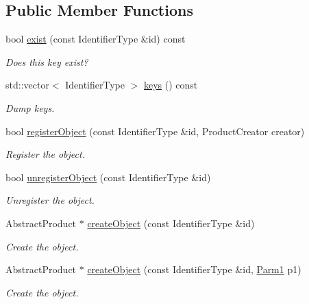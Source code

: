 \subsection*{Public Member Functions}
\begin{DoxyCompactItemize}
\item 
bool \mbox{\hyperlink{classUtil_1_1ObjectFactory_acb89fb305fe8ed1a52fa92d1f463d449}{exist}} (const Identifier\+Type \&id) const
\begin{DoxyCompactList}\small\item\em Does this key exist? \end{DoxyCompactList}\item 
std\+::vector$<$ Identifier\+Type $>$ \mbox{\hyperlink{classUtil_1_1ObjectFactory_a10d2a7a76f67d69f545b7fc69fdc71e0}{keys}} () const
\begin{DoxyCompactList}\small\item\em Dump keys. \end{DoxyCompactList}\item 
bool \mbox{\hyperlink{classUtil_1_1ObjectFactory_a2eb2f1fc927e23a1a266aa6fa8c6562a}{register\+Object}} (const Identifier\+Type \&id, Product\+Creator creator)
\begin{DoxyCompactList}\small\item\em Register the object. \end{DoxyCompactList}\item 
bool \mbox{\hyperlink{classUtil_1_1ObjectFactory_afec1cc774d14a18875e6176695daa422}{unregister\+Object}} (const Identifier\+Type \&id)
\begin{DoxyCompactList}\small\item\em Unregister the object. \end{DoxyCompactList}\item 
Abstract\+Product $\ast$ \mbox{\hyperlink{classUtil_1_1ObjectFactory_acda1e4c447acbb9666db46d230b1a5a1}{create\+Object}} (const Identifier\+Type \&id)
\begin{DoxyCompactList}\small\item\em Create the object. \end{DoxyCompactList}\item 
Abstract\+Product $\ast$ \mbox{\hyperlink{classUtil_1_1ObjectFactory_a0b22cb87ce4398b9529814cc0ede49e6}{create\+Object}} (const Identifier\+Type \&id, \mbox{\hyperlink{classUtil_1_1ObjectFactory_a47e4f863537be7a4f5f5972691bb0b57}{Parm1}} p1)
\begin{DoxyCompactList}\small\item\em Create the object. \end{DoxyCompactList}\item 

\end{DoxyCompactItemize}
